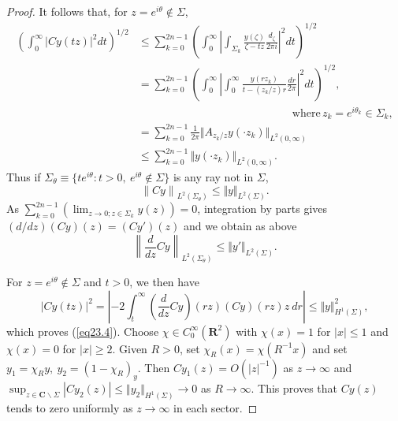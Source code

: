 \documentclass{surv-l}
\theoremstyle{plain}
\theoremstyle{definition}
\numberwithin{equation}{chapter}
\begin{document}
\begin{proof}
It follows that, for $z=e^{i\theta}\not\in\Sigma$,
\begin{align*}
\left(\int_{0}^{\infty}|Cy(tz)|^{2}dt\right)^{1/2} & \leq \sum_{k=0}^{2n-1}
\left(\int_{0}^{\infty}\left|\int_{\Sigma_{k}}\frac{y(\zeta)}{\zeta-tz}\frac{d_{\zeta}}{2\pi i}\right|^{2}dt\right)^{1/2}\\
& = \sum_{k=0}^{2n-1}
\left(\int_{0}^{\infty} \left|\int_{0}^{\infty}\frac{y(rz_{k})}{t-(z_{k}/z)r}\frac{dr}{2\pi}\right|^{2}dt\right)^{1/2},\\
&\qquad \qquad \qquad \qquad \qquad \qquad \qquad \mathrm{where}\, z_{k}=e^{i\theta_{k}}\in\Sigma_{k},\\
& = \sum_{k=0}^{2n-1} \frac{1}{2\pi} \Vert A_{z_{k}/z}y(\cdot z_{k})\Vert_{L^{2}(0,\infty)}\\
& \leq \sum_{k=0}^{2n-1}\Vert y(\cdot z_{k})\Vert_{L^{2}(0,\infty)}.
\end{align*}
Thus if $\Sigma_{\theta}\equiv\{te^{i\theta} : t>0,\ e^{i\theta}\not\in\Sigma\}$ is any ray not in $\Sigma$,
\renewcommand\theequation{23.12}
\setcounter{equation}{11}
\begin{equation}\label{eq23.12}
\left\| Cy\right\|_{L^{2}(\Sigma_{\theta})}\leq\Vert y\Vert_{L^{2}(\Sigma)}.
\end{equation}
As $\sum_{k=0}^{2n-1}(\lim_{z\rightarrow 0;z\in\Sigma_{k}}y(z))=0$, integration by parts gives $(d/dz)(Cy)(z)= (Cy')(z)$ and we obtain as above
\renewcommand\theequation{23.13}
\setcounter{equation}{12}
\begin{equation}\label{eq23.13}
\left\|\frac{d}{dz}Cy\right\|_{L^{2}(\Sigma_{\theta})}\leq\Vert y'\Vert_{L^{2}(\Sigma)}.
\end{equation}

For $ z=e^{i\theta}\not\in\Sigma$ and $t>0$, we then have
\begin{equation*}
|Cy(tz)|^{2}=\left|-2\int_{t}^{\infty}\left(\frac{d}{dz}Cy\right)(rz)(Cy)(rz)z\ dr\right|\leq\Vert y\Vert_{H^{1}(\Sigma)}^{2},
\end{equation*}
which proves (\ref{eq23.4}). Choose $\chi\in C_{0}^{\infty}(\textbf{R}^{2})$ with $\chi(x)=1$ for $|x|\leq 1$ and $\chi(x)=0$ for $|x|\geq 2$. Given $R>0$, set $\chi_{R}(x)=\chi(R^{-1}x)$ and set $y_{1}=\chi_{R}y,\ y_{2}=(1-\chi_{R})_{y}$. Then $Cy_{1}(z)=O(|z|^{-1})$ as $z\rightarrow\infty$ and $\sup_{z\in \textbf{C}\backslash \Sigma}|Cy_{2}(z)|\leq \Vert y_{2}\Vert_{H^{1}(\Sigma)}\rightarrow 0$ as $R\rightarrow\infty$. This proves that $Cy(z)$ tends to zero uniformly as $z\rightarrow\infty$ in each sector.


\end{proof}
\end{document}
